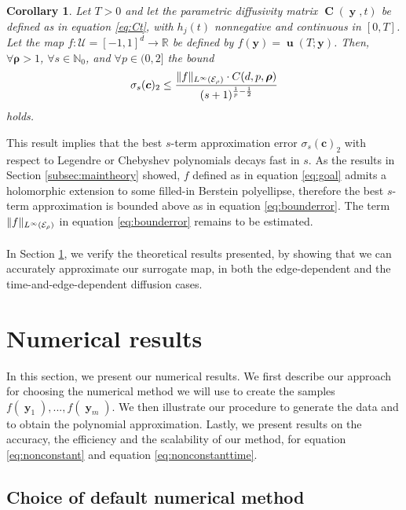\documentclass[12pt, oneside]{report}   	%
\newcommand{\R}{\mathbb{R}}
\newcommand{\N}{\mathbb{N}}
\newtheorem{cor}{Corollary}
\DeclarePairedDelimiter{\norm}{\lVert}{\rVert}        %
\DeclareMathOperator{\CC}{\boldsymbol{C}}
\DeclareMathOperator{\uu}{\boldsymbol{u}}
\DeclareMathOperator{\y}{\boldsymbol{y}}
\begin{document}
\begin{tcolorbox}[colframe=white]
\begin{cor}
\label{cor:maincor}
Let $T>0$ and let the parametric diffusivity matrix $\CC(\y,t)$ be defined as in equation \eqref{eq:Ct}, with $h_j(t)$ nonnegative and continuous in $[0,T]$. Let the map $f:\mathcal{U}=[-1,1]^d\to\R$ be defined by $f(\boldsymbol{y})=\uu(T;\boldsymbol{y})$. Then, $\forall\boldsymbol{\rho}>1$, $\forall s\in\N_0$, and $\forall p\in(0,2]$ the bound
$$
\sigma_s(\boldsymbol{c})_2 \leq \frac{\norm{f}_{L^{\infty}(\mathcal{\mathcal{E}}_\rho)}\cdot C(d,p,\boldsymbol{\rho})}{(s+1)^{\frac{1}{p}-\frac{1}{2}}}
$$
holds.
\end{cor}
\end{tcolorbox}

\noindent This result implies that the best $s$-term approximation error $\sigma_s(\boldsymbol{c})_2$ with respect to Legendre or Chebyshev polynomials decays fast in $s$. As the results in Section \ref{subsec:maintheory} showed, $f$ defined as in equation \eqref{eq:goal} admits a holomorphic extension to some filled-in Berstein polyellipse, therefore the best $s$-term approximation is bounded above as in equation \eqref{eq:bounderror}. The term $\norm{f}_{L^{\infty}(\mathcal{E}_\rho)}$ in equation \eqref{eq:bounderror} remains to be estimated.\\\\
In Section \ref{sec:numerics}, we verify the theoretical results presented, by showing that we can accurately approximate our surrogate map, in both the edge-dependent and the time-and-edge-dependent diffusion cases.


\section{Numerical results}
\label{sec:numerics}

In this section, we present our numerical results. We first describe our approach for choosing the numerical method we will use to create the samples $f(\y_1), ..., f(\y_m)$. We then illustrate our procedure to generate the data and to obtain the polynomial approximation. Lastly, we present results on the accuracy, the efficiency and the scalability of our method, for equation \eqref{eq:nonconstant} and equation \eqref{eq:nonconstanttime}.

\subsection{Choice of default numerical method}
\end{document}
